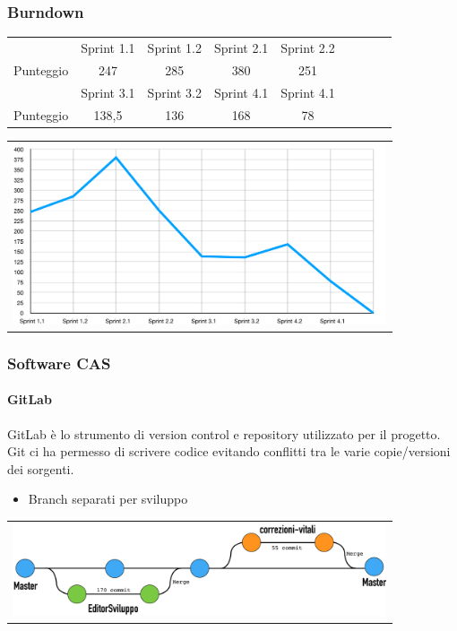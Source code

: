 \documentclass{beamer}
\begin{document}
\begin{frame}
\frametitle{Burndown}
\centering
\begin{tabular}{|c|c|c|c|c|c|c|c|c|}
\hline
					& Sprint 1.1	& Sprint 1.2	&Sprint 2.1	&Sprint 2.2	\\
Punteggio		& 247			& 285			& 380			& 251			\\
\hline
					&Sprint 3.1	&Sprint 3.2	&Sprint 4.1	&Sprint 4.1    \\
Punteggio 	& 138,5			& 136			& 168			& 78 			 	 \\
\hline
\end{tabular}
 \centering
        \begin{tabular}{c}
        \includegraphics[width=11cm]{../burndown/burndown_slides.png}
      \end{tabular}
\end{frame}



\begin{frame}
\frametitle{Software CAS}
\framesubtitle{GitLab}
GitLab è lo strumento di version control e repository utilizzato per il progetto.\\
Git ci ha permesso di scrivere codice evitando conflitti tra le varie copie/versioni dei sorgenti.
  \begin{itemize}
	\item Branch separati per sviluppo
  \end{itemize}
      \centering
        \begin{tabular}{c}
        \includegraphics[width=11cm]{Images/GitLab/branches2}
      \end{tabular}
\end{frame}
\end{document}
